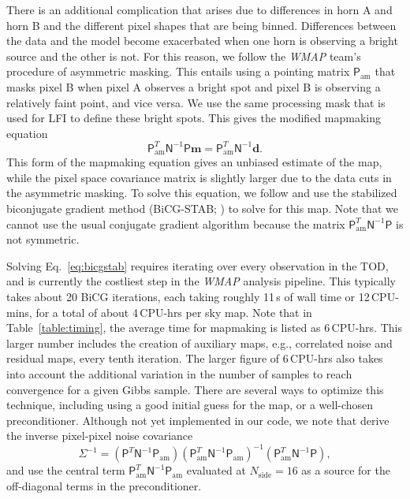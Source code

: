 \documentclass[twocolumn]{aa}
\def\WMAP{\emph{WMAP}}
\begin{document}
There is an additional complication that arises due to differences in horn A
and horn B and the different pixel shapes that are being binned. Differences
between the data and the model become exacerbated when one horn is observing a
bright source and the other is not. For this reason, we follow the \WMAP{}
team's procedure of asymmetric masking. This entails using a pointing matrix
$\mathsf P_\mathrm{am}$ that masks pixel B when pixel A observes a bright spot
and pixel B is observing a relatively faint point, and vice versa. We use the
same processing mask that is used for LFI to define these bright spots. This
gives the modified mapmaking equation
\begin{equation}
	\label{eq:bicgstab}
	\mathsf P_\mathrm{am}^T\mathsf N^{-1}\mathsf P\boldsymbol m=\mathsf P_\mathrm{am}^T\mathsf N^{-1}\boldsymbol d.
\end{equation}
This form of the mapmaking equation gives an unbiased estimate of the map,
while the pixel space covariance matrix is slightly larger due to the data cuts
in the asymmetric masking. To solve this equation, we follow
\citet{jarosik2010} and use the stabilized biconjugate gradient method
(BiCG-STAB; \citealt{bicgstab,bicgstab_template}) to solve for this map. Note
that we cannot use the usual conjugate gradient algorithm because the matrix
$\mathsf P_\mathrm{am}^T\mathsf N^{-1}\mathsf P$ is not symmetric.

Solving Eq.~\eqref{eq:bicgstab} requires iterating over every observation in
the TOD, and is currently the costliest step in the \WMAP{} analysis pipeline.
This typically takes about 20 BiCG iterations, each taking roughly 11\,s of
wall time or 12\,CPU-mins, for a total of about 4\,CPU-hrs per sky map.  Note
that in Table~\ref{table:timing}, the average time for mapmaking is listed as
6\,CPU-hrs. This larger number includes the creation of auxiliary maps, e.g.,
correlated noise and residual maps, every tenth iteration.  The larger figure
of 6\,CPU-hrs also takes into account the additional variation in the number of
samples to reach convergence for a given Gibbs sample.  There are several ways
to optimize this technique, including using a good initial guess for the map,
or a well-chosen preconditioner. Although not yet implemented in our code, we
note that \citet{jarosik2010} derive the inverse pixel-pixel noise covariance
\begin{equation}
	\mathsf{\Sigma}^{-1}=(\mathsf P^T\mathsf N^{-1}\mathsf P_\mathrm{am})(\mathsf P_\mathrm{am}^T\mathsf N^{-1}\mathsf P_\mathrm{am})^{-1}(\mathsf P_\mathrm{am}^T\mathsf N^{-1}\mathsf P),
\end{equation}
and use the central term $\mathsf P_\mathrm{am}^T\mathsf N^{-1}\mathsf P_\mathrm{am}$ evaluated at $N_\mathrm{side}=16$ as a source for the off-diagonal terms in the preconditioner. 
\end{document}
